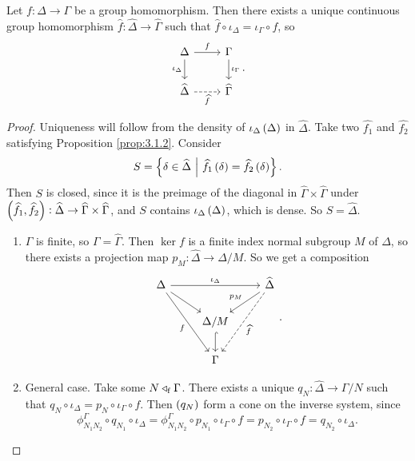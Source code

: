 \begin{proposition}
\label{prop:3.1.2}
Let $ f : \Delta \to \Gamma $ be a group homomorphism. Then there exists a unique continuous group homomorphism $ \widehat{f} : \widehat{\Delta} \to \widehat{\Gamma} $ such that $ \widehat{f} \circ \iota_\Delta = \iota_\Gamma \circ f $, so
$$
\begin{tikzcd}
\Delta \arrow{r}{f} \arrow{d}[swap]{\iota_\Delta} & \Gamma \arrow{d}{\iota_\Gamma} \\
\widehat{\Delta} \arrow[dashed]{r}[swap]{\widehat{f}} & \widehat{\Gamma}
\end{tikzcd}.
$$
\end{proposition}

\begin{proof}
Uniqueness will follow from the density of $ \iota_\Delta\br{\Delta} $ in $ \widehat{\Delta} $. Take two $ \widehat{f_1} $ and $ \widehat{f_2} $ satisfying Proposition \ref{prop:3.1.2}. Consider
$$ S = \cbr{\delta \in \widehat{\Delta} \st \widehat{f_1}\br{\delta} = \widehat{f_2}\br{\delta}}. $$
Then $ S $ is closed, since it is the preimage of the diagonal in $ \widehat{\Gamma} \times \widehat{\Gamma} $ under $ \br{\widehat{f_1}, \widehat{f_2}} : \widehat{\Delta} \to \widehat{\Gamma} \times \widehat{\Gamma} $, and $ S $ contains $ \iota_\Delta\br{\Delta} $, which is dense. So $ S = \widehat{\Delta} $.
\begin{enumerate}[leftmargin=0.5in, label=Case \arabic*.]
\item $ \Gamma $ is finite, so $ \Gamma = \widehat{\Gamma} $. Then $ \ker f $ is a finite index normal subgroup $ M $ of $ \Delta $, so there exists a projection map $ p_M : \widehat{\Delta} \to \Delta / M $. So we get a composition
$$
\begin{tikzcd}
\Delta \arrow{rr}{\iota_\Delta} \arrow{dr} \arrow{ddr}[swap]{f} & & \widehat{\Delta} \arrow{dl}[swap]{p_M} \arrow[dashed]{ddl}{\widehat{f}} \\
& \Delta / M \arrow[hookrightarrow]{d} & \\
& \Gamma &
\end{tikzcd}.
$$
\item General case. Take some $ N \triangleleft_{\mathrm{f}} \Gamma $. There exists a unique $ q_N : \widehat{\Delta} \to \Gamma / N $ such that $ q_N \circ \iota_\Delta = p_N \circ \iota_\Gamma \circ f $. Then $ \br{q_N} $ form a cone on the inverse system, since
$$ \phi_{N_1N_2}^\Gamma \circ q_{N_1} \circ \iota_\Delta = \phi_{N_1N_2}^\Gamma \circ p_{N_1} \circ \iota_\Gamma \circ f = p_{N_2} \circ \iota_\Gamma \circ f = q_{N_2} \circ \iota_\Delta. $$

\end{enumerate}
\end{proof}
